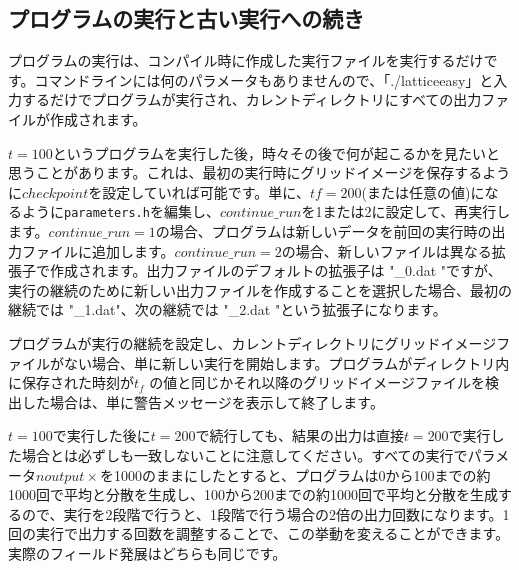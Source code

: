 \documentclass[dvipdfmx,11pt,a4paper,report]{jsbook}
\begin{document}
\subsection{プログラムの実行と古い実行への続き}
プログラムの実行は、コンパイル時に作成した実行ファイルを実行するだけです。コマンドラインには何のパラメータもありませんので、「./latticeeasy」と入力するだけでプログラムが実行され、カレントディレクトリにすべての出力ファイルが作成されます。

$t=100$というプログラムを実行した後，時々その後で何が起こるかを見たいと思うことがあります。これは、最初の実行時にグリッドイメージを保存するように{\tt $checkpoint$}を設定していれば可能です。単に、$tf=200$(または任意の値)になるように{\tt parameters.h}を編集し、{\tt $continue\_run$}を1または2に設定して、再実行します。$continue\_run=1$の場合、プログラムは新しいデータを前回の実行時の出力ファイルに追加します。$continue\_run=2$の場合、新しいファイルは異なる拡張子で作成されます。出力ファイルのデフォルトの拡張子は "\_0.dat "ですが、実行の継続のために新しい出力ファイルを作成することを選択した場合、最初の継続では "\_1.dat"、次の継続では "\_2.dat "という拡張子になります。

プログラムが実行の継続を設定し、カレントディレクトリにグリッドイメージファイルがない場合、単に新しい実行を開始します。プログラムがディレクトリ内に保存された時刻が$t_f$ の値と同じかそれ以降のグリッドイメージファイルを検出した場合は、単に警告メッセージを表示して終了します。

$t=100$で実行した後に$t=200$で続行しても、結果の出力は直接$t=200$で実行した場合とは必ずしも一致しないことに注意してください。すべての実行でパラメータ{\tt $noutput\times$}を1000のままにしたとすると、プログラムは0から100までの約1000回で平均と分散を生成し、100から200までの約1000回で平均と分散を生成するので、実行を2段階で行うと、1段階で行う場合の2倍の出力回数になります。1回の実行で出力する回数を調整することで、この挙動を変えることができます。実際のフィールド発展はどちらも同じです。






\end{document}
